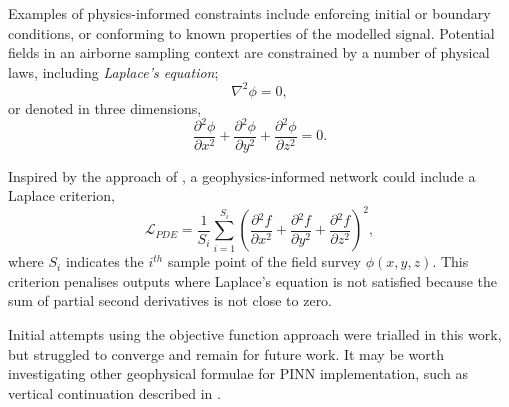 Examples of physics-informed constraints include enforcing initial or boundary conditions, or conforming to known properties of the modelled signal.
Potential fields in an airborne sampling context are constrained by a number of physical laws, including \emph{Laplace's equation};
\[
    \nabla^2 \phi = 0,
\]
or denoted in three dimensions,
\begin{equation}
    \label{eqn:Laplace}
    \frac{\partial{}^2\phi}{\partial{}x^2} + \frac{\partial{}^2\phi}{\partial{}y^2} + \frac{\partial{}^2\phi}{\partial{}z^2} = 0.
\end{equation}

Inspired by the approach of \textcite{raissiPhysicsinformedNeuralNetworks2019}, a geophysics-informed network could include a Laplace criterion,
\begin{equation}
    \label{eqn:crilaplace}
    \mathcal{L}_{PDE} = \frac{1}{S_i}\sum_{i=1}^{S_i} \left(\frac{\partial{}^2f}{\partial{}x^2} + \frac{\partial{}^2f}{\partial{}y^2} + \frac{\partial{}^2f}{\partial{}z^2}\right)^2,
\end{equation}
where \(S_i\) indicates the \(i^{th}\) sample point of the field survey \(\phi(x, y, z)\).
This criterion penalises outputs where Laplace's equation is not satisfied because the sum of partial second derivatives is not close to zero.


Initial attempts using the objective function approach were trialled in this work, but struggled to converge and remain for future work.
It may be worth investigating other geophysical formulae for PINN implementation, such as vertical continuation described in \textcite{blakelyPotentialTheoryGravity1996}.

